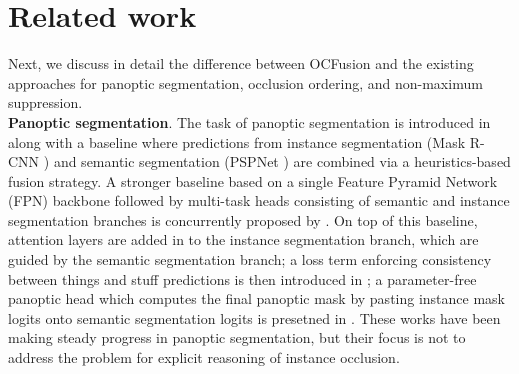 \documentclass[10pt,twocolumn,letterpaper]{article}
\begin{document}
\section{Related work}
\label{sec:related_work}

Next, we discuss in detail the difference between OCFusion and the existing approaches for panoptic segmentation, occlusion ordering, and non-maximum suppression.\\

\noindent \textbf{Panoptic segmentation}. The task of panoptic segmentation is introduced in \cite{kirillov2018panoptic} along with a baseline where predictions from instance segmentation (Mask R-CNN \cite{he2017mask}) and semantic segmentation (PSPNet \cite{zhao2016pspnet}) are combined via a heuristics-based fusion strategy. A stronger baseline based on a single Feature Pyramid Network (FPN) \cite{FPN} backbone followed by multi-task heads consisting of semantic and instance segmentation branches is concurrently proposed by \cite{li2018attention, li2018learning, kirillov2019panoptic, xiong2019upsnet}. On top of this baseline,  attention layers are added in \cite{li2018attention} to the instance segmentation branch, which are guided by the semantic segmentation branch;  a loss term enforcing consistency between things and stuff predictions is then introduced in \cite{li2018learning};  a parameter-free panoptic head which computes the final panoptic mask by pasting instance mask logits onto semantic segmentation logits is presetned in \cite{xiong2019upsnet}. These works have been making steady progress in panoptic segmentation, but their focus is not to address the problem for explicit reasoning of instance occlusion.
\end{document}
